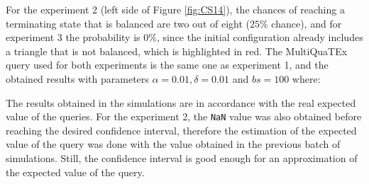 For the experiment 2 (left side of Figure \ref{fig:CS14}), the chances of reaching a terminating state that is balanced are two out of eight ($25\%$ chance), and for experiment 3 the probability is $0\%$, since the initial configuration already includes a triangle that is not balanced, which is highlighted in red. The MultiQuaTEx query used for both experiments is the same one as experiment 1, and the obtained results with parameters $\alpha = 0.01, \delta = 0.01$ and $bs = 100$ where: 
\begin{table}[H]
\centering
{}
\end{table}

The results obtained in the simulations are in accordance with the real expected value of the queries. For the experiment 2, the \texttt{NaN} value was also obtained before reaching the desired confidence interval, therefore the estimation of the expected value of the query was done with the value obtained in the previous batch of simulations. Still, the confidence interval is good enough for an approximation of the expected value of the query.














    